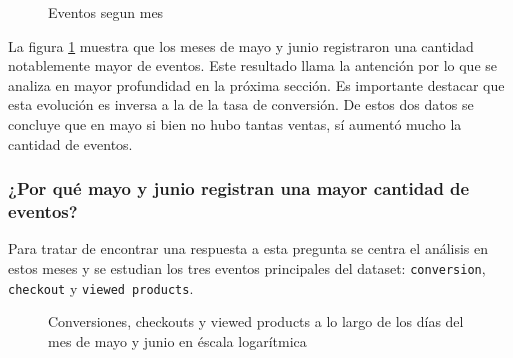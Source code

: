 \documentclass[a4paper]{article}
\begin{document}
\begin{figure}[h!]
	\caption{Eventos segun mes}
	\label{fig:mes}
\end{figure}

La figura \ref{fig:mes} muestra que los meses de mayo y junio registraron una cantidad notablemente mayor de eventos. Este resultado llama la antención por lo que se analiza en mayor profundidad en la próxima sección. Es importante destacar que esta evolución es inversa a la de la tasa de conversión. De estos dos datos se concluye que en mayo si bien no hubo tantas ventas, sí aumentó mucho la cantidad de eventos. 

\subsubsection{¿Por qué mayo y junio registran una mayor cantidad de eventos?}

Para tratar de encontrar una respuesta a esta pregunta se centra el análisis en estos meses y se estudian los tres eventos principales del dataset: \texttt{conversion}, \texttt{checkout} y \texttt{viewed products}.

\begin{figure}[h!]
	\caption{Conversiones, checkouts y viewed products a lo largo de los días del mes de mayo y junio en éscala logarítmica}
	\label{mayojunio}
\end{figure}
\end{document}
